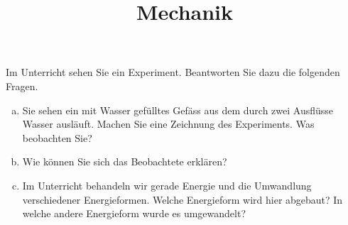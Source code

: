\documentclass[12pt,a4paper,twoside]{article}
\title{Mechanik}
\date{}
\begin{document}
\maketitle



\newpage

%

%
\newpage

\newpage

%
%


%















\begin{aufgabe}
    Im Unterricht sehen Sie ein Experiment.
    Beantworten Sie dazu die folgenden Fragen.
\begin{enumerate} [a)]
    \item Sie sehen ein mit Wasser gefülltes Gefäss aus dem durch zwei Ausflüsse Wasser ausläuft.
    Machen Sie eine Zeichnung des Experiments. Was beobachten Sie?
\item Wie können Sie sich das Beobachtete erklären?
\item Im Unterricht behandeln wir gerade Energie und die Umwandlung verschiedener Energieformen.
    Welche Energieform wird hier abgebaut? In welche andere Energieform wurde es umgewandelt?
\end{enumerate}
\end{aufgabe}





\newpage
{}
\end{document}
